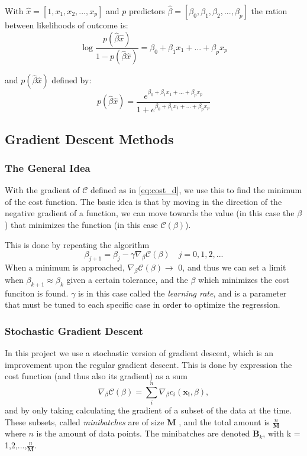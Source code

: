 With $\hat{x} = [1, x_1,x_2,...,x_p]$ and $p$ predictors $\hat{\beta} = [\beta_0,\beta_1,\beta_2,...,\beta_p]$ the ration between likelihoods of outcome is:
\begin{equation}
  \log \frac{p(\hat{\beta}\hat{x})}{1-p(\hat{\beta}\hat{x})} = \beta_0 + \beta_1x_1 + ... + \beta_px_p
  \label{eq:prob_ratio}
\end{equation}

\noindent and $p(\hat{\beta}\hat{x})$ defined by:
\begin{equation}
  p(\hat{\beta}\hat{x}) = \frac{e^{\beta_0 + \beta_1x_1 + ... + \beta_px_p}}{1+e^{\beta_0 + \beta_1x_1 + ... + \beta_px_p}}
  \label{eq:pBx}
\end{equation}

\subsection{Gradient Descent Methods}
\subsubsection*{The General Idea}
With the gradient of $\mathcal{C}$ defined as in \eqref{eq:cost_d}, we use this to find the minimum of the cost function. The basic idea is that by moving in the direction of the negative gradient of a function, we can move towards the value (in this case the $\beta$) that minimizes the function (in this case $\mathcal{C}(\beta)$). \cite{GDLectures}

This is done by repeating the algorithm
\begin{equation}
    \beta_{j+1} = \beta_j - \gamma \nabla_\beta \mathcal{C}(\beta) \quad j = 0,1,2,...
    \label{eq:gradient_decent}
\end{equation}
When a minimum is approached, $\nabla_\beta \mathcal{C}(\beta) \rightarrow$ 0, and thus we can set a limit when $\beta_{k+1} \approx \beta_k$ given a certain tolerance, and the $\beta$ which minimizes the cost funciton is found. $\gamma$ is in this case called the \textit{learning rate}, and is a parameter that must be tuned to each specific case in order to optimize the regression.

\subsubsection*{Stochastic Gradient Descent}
In this project we use a stochastic version of gradient descent, which is an improvement upon the regular gradient descent. This is done by expression the cost function (and thus also its gradient) as a sum
\begin{equation}
    \nabla_\beta \mathcal{C}(\beta) = \sum_i^n     \nabla_\beta c_i(\boldsymbol{x_i},\beta) ,
    \label{eq:gradient_sum}
\end{equation}
and by only taking calculating the gradient of a subset of the data at the time. These subsets, called \textit{minibatches} are of size $\boldsymbol{M}$ , and the total amount is $\frac{n}{\boldsymbol{M}}$ where $n$ is the amount of data points. The minibatches are denoted $\boldsymbol{B}_k$, with k = 1,2,...,$\frac{n}{\boldsymbol{M}}$.

